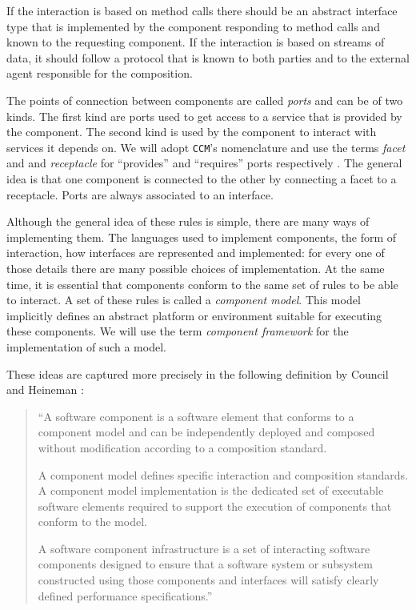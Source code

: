 If the interaction is based on method calls there should be an abstract interface type that is implemented by the component responding
to method calls and known to the requesting component. If the interaction is based on streams of data, it should follow a protocol
that is known to both parties and to the external agent responsible for the composition.

The points of connection between components are called \emph{ports} and can be of two kinds. The first kind are ports used to
get access to a service that is provided by the component. The second kind is used by the component to interact with services
it depends on. We will adopt \texttt{CCM}'s nomenclature and use the terms \emph{facet} and and \emph{receptacle} for
``provides'' and ``requires'' ports respectively \cite{CCM}. The general idea is that one component is connected to the other
by connecting a facet to a receptacle. Ports are always associated to an interface.

Although the general idea of these rules is simple, there are many ways of implementing them. The languages used to implement
components, the form of interaction, how interfaces are represented and implemented: for every one of those details there
are many possible choices of implementation. At the same time, it is essential that components conform to the same set of
rules to be able to interact. A set of these rules is called a \emph{component model}. This model implicitly defines an abstract
platform or environment suitable for executing these components. We will use the term \emph{component framework} for the
implementation of such a model.

These ideas are captured more precisely in the following definition by Council and Heineman \cite{Heineman}:

\begin{quotation}
``A software component is a software element that conforms to a component model and can be independently deployed and composed
without modification according to a composition standard.

A component model defines specific interaction and composition standards. A component model implementation is the dedicated
set of executable software elements required to support the execution of components that conform to the model.

A software component infrastructure is a set of interacting software components designed to ensure that a software system
or subsystem constructed using those components and interfaces will satisfy clearly defined performance specifications.''
\end{quotation}

